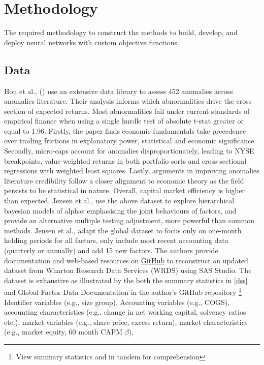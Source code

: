 \documentclass[10pt]{article}
\begin{document}
\section{Methodology}
The required methodology to construct the methods to build, develop, and deploy neural networks with custom objective functions.
\subsection{Data}\label{data}
Hou et al., (\citeyear{hou2020replicating}) use an extensive data library to assess 452 anomalies across anomalies literature.
Their analysis informs which abnormalities drive the cross section of expected returns. 
Most abnormalities fail under current standards of empirical finance when using a single hurdle test of absolute t-stat greater or equal to 1.96.
Firstly, the paper finds economic fundamentals take precedence over trading frictions in explanatory power, statistical and economic significance.
Secondly, micro-caps account for anomalies disproportionately, leading to NYSE breakpoints, value-weighted returns in both portfolio sorts and cross-sectional regressions with weighted least squares. 
Lastly, arguments in improving anomalies literature credibility follow a closer alignment to economic theory as the field persists to be statistical in nature.
Overall, capital market efficiency is higher than expected.
Jensen et al., \citeyear{jensen2021there} use the above dataset to explore hierarchical bayesian models of alphas emphasising the joint behaviours of factors, 
and provide an alternative multiple testing adjustment, more powerful than common methods.
Jensen et al., adapt the global dataset to focus only on one-month holding periods for all factors, only include most recent accounting data (quarterly or annually) and add 15 new factors.
The authors provide documentation and web-based resources on \href{https://github.com/bkelly-lab/ReplicationCrisis}{GitHub} to reconstruct an updated dataset from Wharton Research Data Services (WRDS) using SAS Studio.
The dataset is exhaustive as illustrated by the both the summary statistics in \ref{dss} and Global Factor Data Documentation in the author's GitHub repository \footnote[1]{View summary statistics and  in tandem for comprehension}
Identifier variables (e.g., size group), Accounting variables (e.g., COGS), accounting characteristics (e.g., change in net working capital, solvency ratios etc.), market variables (e.g., share price, excess return), market characteristics (e.g., market equity, 60 month CAPM $\beta$), 
\end{document}
